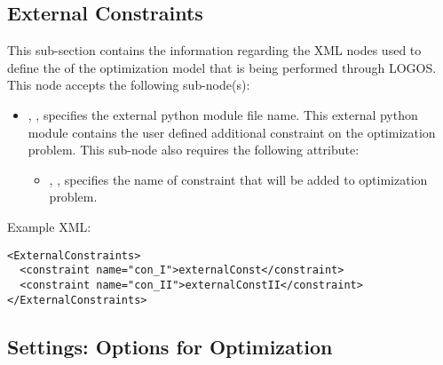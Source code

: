 %
\subsection{External Constraints}
\label{subsec:ExternalConstraints}

This sub-section contains the information regarding the XML nodes used to define the
 of the optimization model that is being performed through LOGOS.
This node accepts the following sub-node(s):
\begin{itemize}
  \item {}, , specifies the external python
  module file name. This external python module contains the user defined additional constraint
  on the optimization problem. This sub-node also requires the following attribute:
  \begin{itemize}
    \item {}, , specifies the name of constraint that will
    be added to optimization problem.
  \end{itemize}
\end{itemize}

Example XML:
\begin{lstlisting}[style=XML]
<ExternalConstraints>
  <constraint name="con_I">externalConst</constraint>
  <constraint name="con_II">externalConstII</constraint>
</ExternalConstraints>
\end{lstlisting}


%
\subsection{Settings: Options for Optimization}
\label{subsec:Settings}

